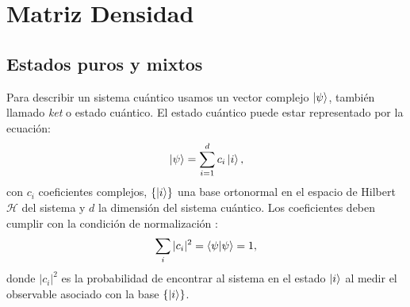 \documentclass[letterpaper,12pt]{thesisECFM}
\theoremstyle{plain}
\theoremstyle{definition}
\theoremstyle{definition}
\theoremstyle{remark}
\newcommand{\1}{\mathbb{1}}
\begin{document}
\section{Matriz Densidad} %
\label{sec:matriz_densidad}
\subsection{Estados puros y mixtos} %
Para describir un sistema cuántico usamos un vector complejo $\ket{\psi}$,
también llamado \textit{ket} o estado cuántico. El
estado cuántico puede estar representado por la ecuación: 
\begin{equation}
     \label{eq:1.1}
         \ket{\psi} = \sum_{i=1}^{d} c_i \ket{i},
\end{equation}
con $c_i$ coeficientes complejos,
$\{\ket{i}\}$ una base ortonormal en el espacio de Hilbert $\mathcal{H}$ del
sistema  y $d$ la dimensión del
sistema cuántico.  Los coeficientes deben cumplir con la condición de
normalización \cite{nielsen_chuang_2011}:
    \begin{equation}
    \label{ec::1.2}
           \sum_i |c_i|^2=\braket{\psi}{\psi}=1, 
    \end{equation} 
donde $|c_i|^2$ es la probabilidad de encontrar al sistema en el estado
$\ket{i}$ al medir el observable asociado con la base $\{\ket{i} \}$.
\end{document}
